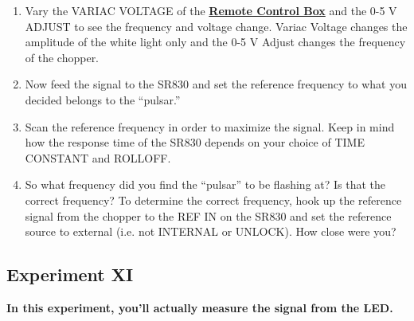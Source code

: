 \documentclass{../lab}
\begin{document}
\begin{enumerate}
    \item Vary the VARIAC VOLTAGE of the \href{https://berkeley-physics111b.github.io/appendices/LLS-Appendix-C-the-Remote-Control-Box/}{\textbf{Remote Control Box}} and the 0-5 V ADJUST to see the frequency and voltage change. Variac Voltage changes the amplitude of the white light only and the 0-5 V Adjust changes the frequency of the chopper.

    \item Now feed the signal to the SR830 and set the reference frequency to what you decided belongs to the ``pulsar.''

    \item Scan the reference frequency in order to maximize the signal. Keep in mind how the response time of the SR830 depends on your choice of TIME CONSTANT and ROLLOFF.

    \item So what frequency did you find the ``pulsar'' to be flashing at? Is that the correct frequency? To determine the correct frequency, hook up the reference signal from the chopper to the REF IN on the SR830 and set the reference source to external (i.e. not INTERNAL or UNLOCK). How close were you?
\end{enumerate}

\subsection{Experiment XI}

\textbf{In this experiment, you'll actually measure the signal from the LED.}
\end{document}
